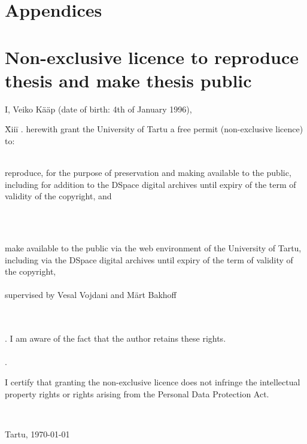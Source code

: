 \documentclass{style/bachelor-thesis}
\begin{document}
\newpage

\appendix
\section*{Appendices}
\renewcommand{\thesubsection}{\Alph{subsection}}

\pagebreak
\section*{\small Non-exclusive licence to reproduce thesis and make thesis public}


I, Veiko Kääp (date of birth: 4th of January 1996),

\begin{tabbing}
\= Xiii\=\kill
{}. \> herewith grant the University of Tartu a free permit (non-exclusive licence) to:\\\\ 

\> 
\begin{minipage}[t]{14.2cm}
reproduce, for the purpose of preservation and making available to the public, including for addition to the DSpace digital archives until expiry of the term of validity of the copyright, and
\end{minipage}
\\\\
\begin{minipage}[t]{14.2cm}
make available to the public via the web environment of the University of Tartu, including via the DSpace digital archives until expiry of the term of validity of the copyright,\\ 

\articleName\\   

supervised by Vesal Vojdani and Märt Bakhoff

\end{minipage}\\\\ 
. \>I am aware of the fact that the author retains these rights.\\\\
. \>
\begin{minipage}[t]{14.2cm}
I certify that granting the non-exclusive licence does not infringe the intellectual property rights or rights arising from the Personal Data Protection Act. 
\end{minipage}\\
\end{tabbing}

\noindent
Tartu, \today
\end{document}
